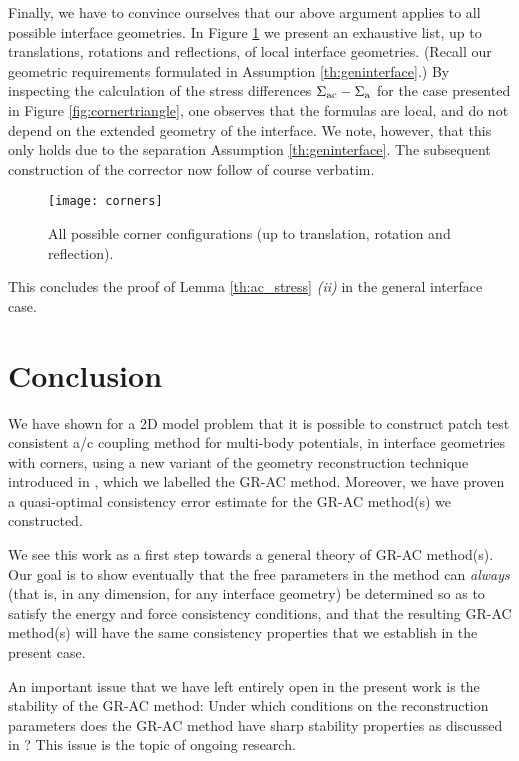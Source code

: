 \documentclass[12pt, reqno, a4paper]{amsart}
\numberwithin{equation}{section}
\numberwithin{theorem}{section}
\numberwithin{remark}{section}
\begin{document}
Finally, we have to convince ourselves that our above argument applies
to all possible interface geometries. In Figure \ref{fig:corners} we
present an exhaustive list, up to translations, rotations and
reflections, of local interface geometries. (Recall our geometric
requirements formulated in Assumption \ref{th:geninterface}.) By
inspecting the calculation of the stress differences ${\Sigma_{{\rm ac}}} - {\Sigma_{{\rm a}}}$ for
the case presented in Figure \ref{fig:cornertriangle}, one observes
that the formulas are local, and do not depend on the extended
geometry of the interface. We note, however, that this only holds due
to the separation Assumption \ref{th:geninterface}. The subsequent
construction of the corrector now follow of course verbatim.

\begin{figure}
  \begin{center}
    \texttt{[image: corners]}
   \end{center}
   \caption{All possible corner configurations (up to translation,
     rotation and reflection).}
\label{fig:corners}
\end{figure}

This concludes the proof of Lemma \ref{th:ac_stress} {\it (ii)} in the
general interface case.

\section{Conclusion}
We have shown for a 2D model problem that it is possible to construct
patch test consistent a/c coupling method for multi-body potentials,
in interface geometries with corners, using a new variant of the
geometry reconstruction technique introduced in \cite{E:2006,
  Shimokawa:2004}, which we labelled the GR-AC method. Moreover, we
have proven a quasi-optimal consistency error estimate for the GR-AC
method(s) we constructed.

We see this work as a first step towards a general theory of GR-AC
method(s). Our goal is to show eventually that the free parameters in the
method can {\it always} (that is, in any dimension, for any interface
geometry) be determined so as to satisfy the energy and force
consistency conditions, and that the resulting GR-AC method(s) will
have the same consistency properties that we establish in the present
case.

An important issue that we have left entirely open in the present work
is the stability of the GR-AC method: Under which conditions on the
reconstruction parameters does the GR-AC method have sharp stability
properties as discussed in \cite{Dobson:qce.stab}?  This issue is the
topic of ongoing research.



\end{document}
